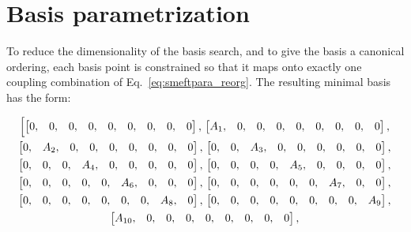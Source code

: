 \section{Basis parametrization}
\label{sec:appendix_basis_parametrization}

To reduce the dimensionality of the basis search, and to give the basis a canonical ordering, each basis point is constrained so that it maps onto exactly one coupling combination of Eq.~\eqref{eq:smeftpara_reorg}. The resulting minimal basis has the form:

\begin{multline}\Bigl[ \begin{bmatrix} 0, & 0, & 0, & 0, & 0, & 0, & 0, & 0, & 0  \end{bmatrix},\,
 \begin{bmatrix} A_{1}, & 0, & 0, & 0, & 0, & 0, & 0, & 0, & 0  \end{bmatrix},\, \\ %
 \begin{bmatrix} 0, & A_{2}, & 0, & 0, & 0, & 0, & 0, & 0, & 0  \end{bmatrix},\, %
 \begin{bmatrix} 0, & 0, & A_{3}, & 0, & 0, & 0, & 0, & 0, & 0  \end{bmatrix},\, \\ %
 \begin{bmatrix} 0, & 0, & 0, & A_{4}, & 0, & 0, & 0, & 0, & 0  \end{bmatrix},\, %
 \begin{bmatrix} 0, &  0, & 0, &  0, & A_{5}, & 0, & 0, & 0, & 0  \end{bmatrix},\, \\%
 \begin{bmatrix} 0, &  0, &  0, &  0, & 0, & A_{6}, & 0, & 0, & 0  \end{bmatrix},\,  %
 \begin{bmatrix} 0, &  0, &  0, &  0, & 0, & 0, & A_{7}, & 0, & 0  \end{bmatrix},\, \\%
 \begin{bmatrix} 0, &  0, &  0, &  0, & 0, & 0, & 0, & A_{8}, & 0  \end{bmatrix},\,  %
 \begin{bmatrix} 0, &  0, &  0, &  0, & 0, & 0, & 0, & 0, & A_{9}  \end{bmatrix},\, \\ %
 \begin{bmatrix} A_{10}, & 0, & 0, & 0, & 0, & 0, & 0, & 0, & 0  \end{bmatrix},\, %

\end{multline}
